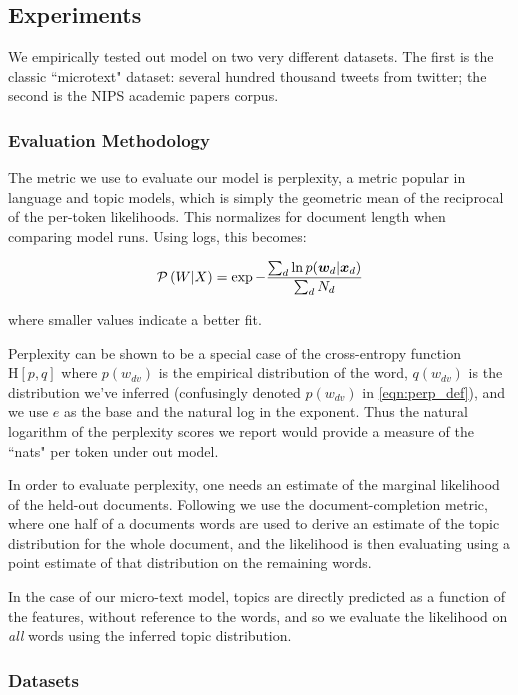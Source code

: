 \subsection{Experiments}
We empirically tested out model on two very different datasets. The first is the classic ``microtext" dataset: several hundred thousand tweets from twitter; the second is the NIPS academic papers corpus.

\subsubsection*{Evaluation Methodology}
The metric we use to evaluate our model is perplexity, a metric popular in language and topic models, which is simply the geometric mean of the reciprocal of the per-token likelihoods. This normalizes for document length when comparing model runs. Using logs, this becomes:

\newcommand \perplx[1] { \mathcal{P} \left( #1 \right) }

\begin{equation}
\perplx{W|X} = \exp - \frac{\sum_d \ln p(\vv{w}_d|\xd)}{\sum_d N_d} \label{eqn:perp_def}
\end{equation}

where smaller values indicate a better fit. 

Perplexity can be shown to be a special case of the cross-entropy function $\text{H}[p,q]$ where $p(w_{dv})$ is the empirical distribution of the word, $q(w_{dv})$ is the distribution we've inferred (confusingly denoted $p(w_{dv})$ in \eqref{eqn:perp_def}), and we use $e$ as the base and the natural log in the exponent. Thus the natural logarithm of the perplexity scores we report would provide a measure of the ``nats" per token under out model.

In order to evaluate perplexity, one needs an estimate of the marginal likelihood of the held-out documents. Following \cite{Asuncion2012}\cite{Wallach2009b} we use the document-completion metric, where one half of a documents words are used to derive an estimate of the topic distribution for the whole document, and the likelihood is then evaluating using a point estimate of that distribution on the remaining words.

In the case of our micro-text model, topics are directly predicted as a function of the features, without reference to the words, and so we evaluate the likelihood on \emph{all} words using the inferred topic distribution.


\subsubsection{Datasets}
